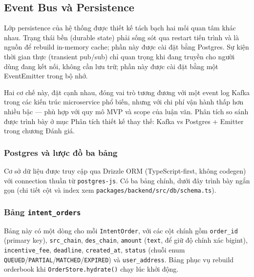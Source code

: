 
\subsection{Event Bus và Persistence}
\label{sec:event-bus-persistence}

Lớp persistence của hệ thống được thiết kế tách bạch hai mối quan tâm khác nhau. Trạng thái bền (durable state) phải sống sót qua restart tiến trình và là nguồn để rebuild in-memory cache; phần này được cài đặt bằng Postgres. Sự kiện thời gian thực (transient pub/sub) chỉ quan trọng khi đang truyền cho người dùng đang kết nối, không cần lưu trữ; phần này được cài đặt bằng một EventEmitter trong bộ nhớ.

Hai cơ chế này, đặt cạnh nhau, đóng vai trò tương đương với một event log Kafka trong các kiến trúc microservice phổ biến, nhưng với chi phí vận hành thấp hơn nhiều bậc — phù hợp với quy mô MVP và scope của luận văn. Phân tích so sánh được trình bày ở mục Phân tích thiết kế thay thế: Kafka vs Postgres + Emitter trong chương Đánh giá.

\subsubsection{Postgres và lược đồ ba bảng}

Cơ sở dữ liệu được truy cập qua Drizzle ORM (TypeScript-first, không codegen) với connection thuần từ \texttt{postgres-js}. Có ba bảng chính, dưới đây trình bày ngắn gọn (chi tiết cột và index xem \texttt{packages/backend/src/db/schema.ts}).

\subsubsection*{Bảng \texttt{intent\_orders}}

Bảng này có một dòng cho mỗi \texttt{IntentOrder}, với các cột chính gồm \texttt{order\_id} (primary key), \texttt{src\_chain}, \texttt{des\_chain}, \texttt{amount} (\texttt{text}, để giữ độ chính xác bigint), \texttt{incentive\_fee}, \texttt{deadline}, \texttt{created\_at}, \texttt{status} (chuỗi enum \texttt{QUEUED}/\texttt{PARTIAL}/\texttt{MATCHED}/\texttt{EXPIRED}) và \texttt{user\_address}. Bảng phục vụ rebuild orderbook khi \texttt{OrderStore.hydrate()} chạy lúc khởi động.

